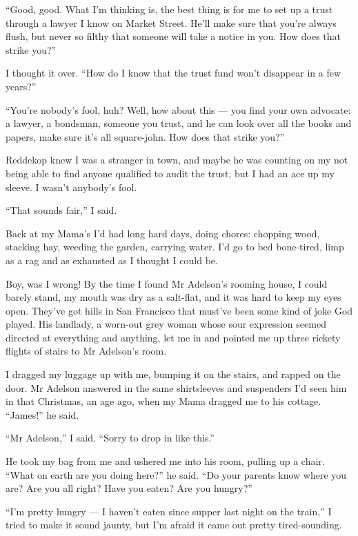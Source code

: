 ``Good, good. What I'm thinking is, the best thing is for me to set up a trust 
through a lawyer I know on Market Street. He'll make sure that you're always 
flush, but never so filthy that someone will take a notice in you. How does 
that strike you?''

I thought it over.
``How do I know that the trust fund won't disappear in a few years?''

``You're nobody's fool, huh? Well, how about this --- you find your own 
advocate: a lawyer, a bondsman, someone you trust, and he can look over all the 
books and papers, make sure it's all square-john. How does that strike you?''

Reddekop knew I was a stranger in town, and maybe he was counting
on my not being able to find anyone qualified to audit the trust,
but I had an ace up my sleeve. I wasn't anybody's fool.

``That sounds fair,'' I said.

\tb

Back at my Mama's I'd had long hard days, doing chores: chopping
wood, stacking hay, weeding the garden, carrying water. I'd go to
bed bone-tired, limp as a rag and as exhausted as I thought I could
be.

Boy, was I wrong! By the time I found Mr Adelson's rooming house, I
could barely stand, my mouth was dry as a salt-flat, and it was
hard to keep my eyes open. They've got hills in San Francisco that
must've been some kind of joke God played. His landlady, a worn-out
grey woman whose sour expression seemed directed at everything and
anything, let me in and pointed me up three rickety flights of
stairs to Mr Adelson's room.

I dragged my luggage up with me, bumping it on the stairs, and
rapped on the door. Mr Adelson answered in the same shirtsleeves
and suspenders I'd seen him in that Christmas, an age ago, when my
Mama dragged me to his cottage. ``James!'' he said.

``Mr Adelson,'' I said. ``Sorry to drop in like this.''

He took my bag from me and ushered me into his room, pulling up a
chair. ``What on earth are you doing here?'' he said.
``Do your parents know where you are? Are you all right? Have you eaten? Are 
you hungry?''

``I'm pretty hungry --- I haven't eaten since supper last night on the train,''
I tried to make it sound jaunty, but I'm afraid it came out pretty
tired-sounding.


